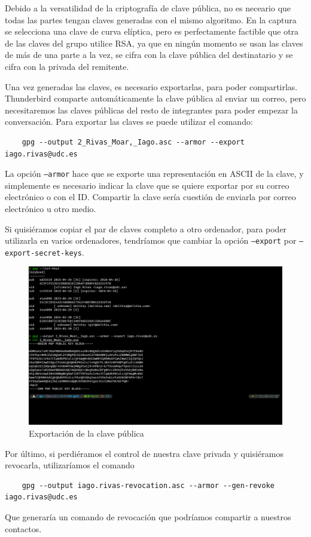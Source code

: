 Debido a la versatilidad de la criptografía de clave pública, no es neceario que todas las partes tengan claves generadas con el mismo algoritmo. En la captura se selecciona una clave de curva elíptica, pero es perfectamente factible que otra de las claves del grupo utilice RSA, ya que en ningún momento se usan las claves de más de una parte a la vez, se cifra con la clave pública del destinatario y se cifra con la privada del remitente.

Una vez generadas las claves, es necesario exportarlas, para poder compartirlas. Thunderbird comparte automáticamente la clave pública al enviar un correo, pero necesitaremos las claves públicas del resto de integrantes para poder empezar la conversación. Para exportar las claves se puede utilizar el comando:

\begin{verbatim}
    gpg --output 2_Rivas_Moar,_Iago.asc --armor --export iago.rivas@udc.es
\end{verbatim}

La opción \texttt{--armor} hace que se exporte una representación en ASCII de la clave, y simplemente es necesario indicar la clave que se quiere exportar por su correo electrónico o con el ID. Compartir la clave sería cuestión de enviarla por correo electrónico u otro medio.

Si quisiéramos copiar el par de claves completo a otro ordenador, para poder utilizarla en varios ordenadores, tendríamos que cambiar la opción \texttt{--export} por \texttt{--export-secret-keys}.

\begin{figure}[H]
    \includegraphics[width=15cm]{gpg-export.png}
    \caption{Exportación de la clave pública}
\end{figure}

Por último, si perdiéramos el control de nuestra clave privada y quisiéramos revocarla, utilizaríamos el comando

\begin{verbatim}
    gpg --output iago.rivas-revocation.asc --armor --gen-revoke iago.rivas@udc.es
\end{verbatim}

Que generaría un comando de revocación que podríamos compartir a nuestros contactos.